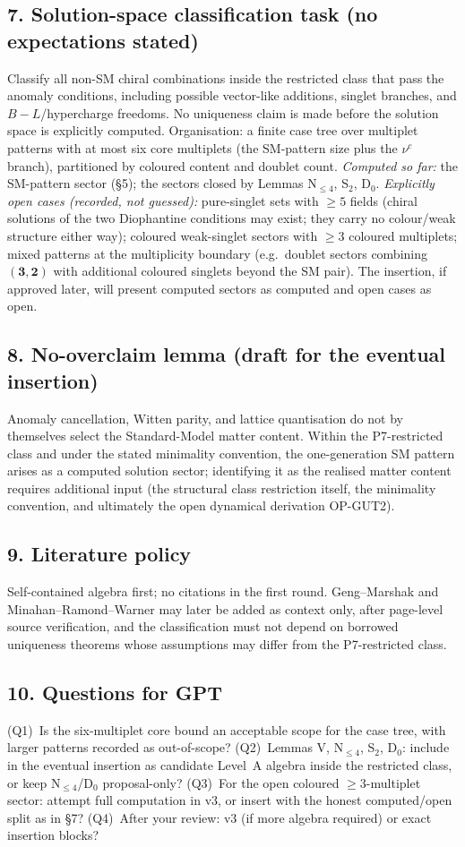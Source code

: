 \subsection*{7. Solution-space classification task (no
expectations stated)}
Classify all non-SM chiral combinations inside the restricted
class that pass the anomaly conditions, including possible
vector-like additions, singlet branches, and $B-L$/hypercharge
freedoms.
No uniqueness claim is made before the solution space is
explicitly computed.
Organisation: a finite case tree over multiplet patterns with at
most six core multiplets (the SM-pattern size plus the $\nu^c$
branch), partitioned by coloured content and doublet count.
\emph{Computed so far:} the SM-pattern sector (\S5);
the sectors closed by Lemmas N$_{\le4}$, S$_2$, D$_0$.
\emph{Explicitly open cases (recorded, not guessed):}
pure-singlet sets with $\ge5$ fields (chiral solutions of the two
Diophantine conditions may exist; they carry no colour/weak
structure either way);
coloured weak-singlet sectors with $\ge3$ coloured multiplets;
mixed patterns at the multiplicity boundary (e.g.\ doublet sectors
combining $(\mathbf 3,\mathbf 2)$ with additional coloured
singlets beyond the SM pair).
The insertion, if approved later, will present computed sectors as
computed and open cases as open.

\subsection*{8. No-overclaim lemma (draft for the eventual
insertion)}
Anomaly cancellation, Witten parity, and lattice quantisation do
not by themselves select the Standard-Model matter content.
Within the P7-restricted class and under the stated minimality
convention, the one-generation SM pattern arises as a computed
solution sector; identifying it as the realised matter content
requires additional input (the structural class restriction
itself, the minimality convention, and ultimately the open
dynamical derivation OP-GUT2).

\subsection*{9. Literature policy}
Self-contained algebra first; no citations in the first round.
Geng--Marshak and Minahan--Ramond--Warner may later be added as
context only, after page-level source verification, and the
classification must not depend on borrowed uniqueness theorems
whose assumptions may differ from the P7-restricted class.

\subsection*{10. Questions for GPT}
(Q1)~Is the six-multiplet core bound an acceptable scope for the
case tree, with larger patterns recorded as out-of-scope?
(Q2)~Lemmas V, N$_{\le4}$, S$_2$, D$_0$: include in the eventual
insertion as candidate Level~A algebra inside the restricted
class, or keep N$_{\le4}$/D$_0$ proposal-only?
(Q3)~For the open coloured $\ge3$-multiplet sector: attempt full
computation in v3, or insert with the honest computed/open split
as in \S7?
(Q4)~After your review: v3 (if more algebra required) or exact
insertion blocks?
